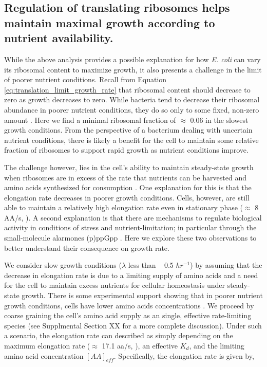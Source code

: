 \subsection{Regulation of translating ribosomes helps maintain maximal growth
according to nutrient availability.}

While the above analysis provides a possible explanation for how \textit{E. coli}
can vary its ribosomal content to maximize growth, it also presents a
challenge in the limit of poorer nutrient conditions. Recall from Equation
\ref{eq:translation_limit_growth_rate} that ribosomal content should decrease to
zero as growth decreases to zero. While bacteria tend to decrease their
ribosomal abundance in poorer nutrient conditions, they do so only to some
fixed, non-zero amount \citep{scott2010, liebermeister2014}. Here we find a
minimal ribosomal fraction of $\approx$ 0.06 in the slowest growth conditions.
From the perspective of a bacterium dealing with uncertain nutrient conditions,
there is likely a benefit for the cell to maintain some relative fraction of
ribosomes to support rapid growth as nutrient conditions improve.

The challenge however, lies in the cell's ability to maintain steady-state
growth when ribosomes are in excess of the rate that nutrients can be harvested
and amino  acids synthesized for consumption . One
explanation for this is that the elongation rate decreases in poorer growth
conditions. Cells, however, are still able to maintain a relatively high
elongation rate even in stationary phase ($\approx$ 8 AA/s, \citep{dai2016,
dai2018}). A second explanation is that there are mechanisms to regulate
biological activity in conditions of stress and nutrient-limitation; in
particular through the small-molecule alarmones (p)ppGpp \citep{harris2018}.
Here we explore these two observations to better understand their consequence on
growth rate.

We consider slow growth conditions ($\lambda$ less than ~ 0.5 $hr^{-1}$) by
assuming that the decrease in elongation rate is due to a
limiting supply of amino acids and a need for the cell to maintain excess
nutrients for cellular homeostasis under steady-state growth. There is some
experimental support showing that in poorer nutrient growth conditions, cells
have lower amino acids concentrations \citep{bennett2009}. We proceed by coarse
graining the cell's amino acid supply as an single, effective rate-limiting
species (see Supplmental Section XX for a more complete discussion). Under such a scenario,
the elongation rate can described as simply depending on the maximum elongation
rate ($\approx$ 17.1 aa/s, \citep{dai2016, dai2018}), an effective $K_d$, and
the limiting amino acid concentration $[AA]_{eff}$. Specifically, the elongation
rate is given by,

